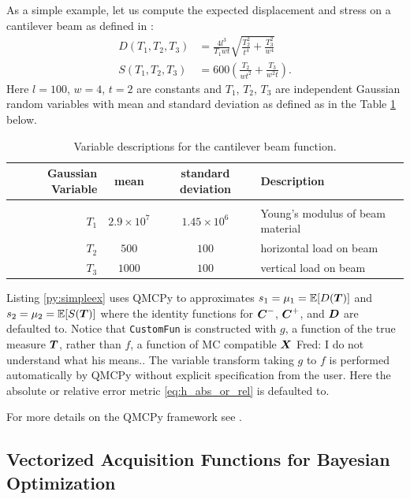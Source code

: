 \documentclass{article}[12pt]
\newcommand{\FJHComment}[1]{{\color{purple}Fred:  #1}}
\begin{document}
As a simple example, let us compute the expected displacement and stress on a cantilever beam as defined in \cite{ simulationlib_cantilever}: 
\begin{align*}
    D(T_1,T_2,T_3) &= \frac{4l^3}{T_1 w t} \sqrt{\frac{T_2^2}{t^4} + \frac{T_3^2}{w^4}} \\ 
    S(T_1,T_2,T_3) &= 600\left(\frac{T_2}{wt^2} + \frac{T_3}{w^2t}\right).
    \label{eq:cantilever_beam}
\end{align*}
Here $l=100$, $w=4$, $t=2$ are constants and $T_1$, $T_2$, $T_3$ are independent Gaussian random variables with mean and standard deviation as defined as in the Table \ref{tab:cantilever_beam} below.
\begin{table}[t]
    \centering
    \begin{tabular}{r c c l}
        Gaussian Variable & mean & standard deviation & Description \\ 
        \hline \\
        $T_1$ & $2.9 \times 10^7$ & $1.45 \times 10^6$ & Young's modulus of beam material \\
        $T_2$ & $500$ & $100$ & horizontal load on beam \\
        $T_3$ & $1000$ & $100$ & vertical load on beam
    \end{tabular}
    \caption{Variable descriptions for the cantilever beam function.}
    \label{tab:cantilever_beam}
\end{table}
Listing \ref{py:simpleex} uses QMCPy to approximates $s_1 = \mu_1 = \mathbb{E}[D(\boldsymbol{T})]$ and $s_2 = \mu_2 = \mathbb{E}[S(\boldsymbol{T})]$ where the identity functions for $\boldsymbol{C}^-$, $\boldsymbol{C}^+$, and $\boldsymbol{D}$ are defaulted to. Notice that \texttt{CustomFun} is constructed with $g$, a function of the true measure $\boldsymbol{T}$, rather than $f$, a function of MC compatible $\boldsymbol{X}$ \FJHComment{I do not understand what his means.}. The variable transform taking $g$ to $f$ is performed automatically by QMCPy without explicit specification from the user. Here the absolute or relative error metric \eqref{eq:h_abs_or_rel} is defaulted to.

For more details on the QMCPy framework see \cite{QMCSoftware}.

\subsection{Vectorized Acquisition Functions for Bayesian Optimization}
\end{document}
